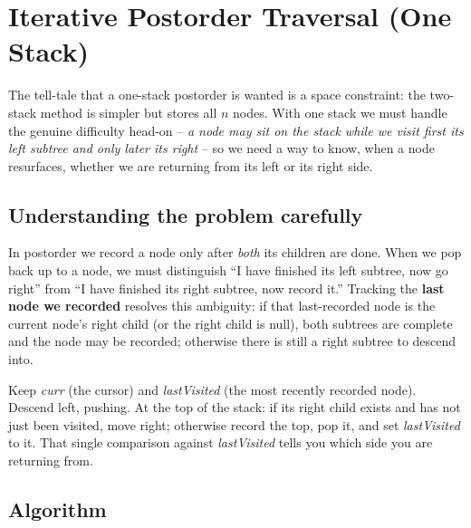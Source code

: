 \section{Iterative Postorder Traversal (One Stack)}
\label{sec:trees-iter-post-one}


\begin{patternbox}
The tell-tale that a one-stack postorder is wanted is a space constraint:
the two-stack method is simpler but stores all $n$ nodes. With one stack we
must handle the genuine difficulty head-on -- \emph{a node may sit on the
stack while we visit first its left subtree and only later its right} --
so we need a way to know, when a node resurfaces, whether we are returning
from its left or its right side.
\end{patternbox}

\subsection*{Understanding the problem carefully}

In postorder we record a node only after \emph{both} its children are
done. When we pop back up to a node, we must distinguish ``I have finished
its left subtree, now go right'' from ``I have finished its right subtree,
now record it.'' Tracking the \textbf{last node we recorded} resolves this
ambiguity: if that last-recorded node is the current node's right child
(or the right child is null), both subtrees are complete and the node may
be recorded; otherwise there is still a right subtree to descend into.

\begin{ideabox}
Keep \textit{curr} (the cursor) and \textit{lastVisited} (the most
recently recorded node). Descend left, pushing. At the top of the stack:
if its right child exists and has not just been visited, move right;
otherwise record the top, pop it, and set \textit{lastVisited} to it. That
single comparison against \textit{lastVisited} tells you which side you are
returning from.
\end{ideabox}

\subsection*{Algorithm}

